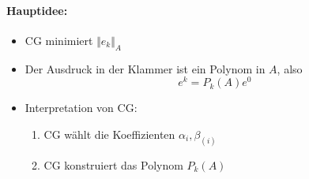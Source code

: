 \paragraph*{Hauptidee:}
\begin{itemize}
 \item CG minimiert $\Vert e_k \Vert_A$
 \item Der Ausdruck in der Klammer ist ein Polynom in $A$, also
  \begin{equation*}
   e^k=P_k(A)e^0
  \end{equation*}

 \item Interpretation von CG:
  \begin{enumerate}
   \item CG wählt die Koeffizienten $\alpha_i,\beta_{(i)}$
   \item CG konstruiert das Polynom $P_k(A)$
  \end{enumerate}
\end{itemize}

\bigskip

